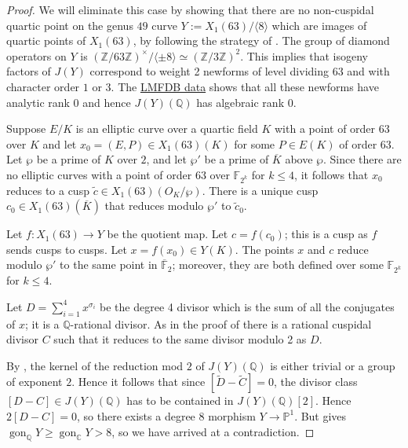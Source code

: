 \documentclass[11pt,reqno]{amsart}
\DeclareMathOperator{\gon}{gon}
\theoremstyle{definition}
\numberwithin{equation}{section}
\newcommand{\Q}{\mathbb{Q}}
\newcommand{\C}{\mathbb{C}}
\newcommand{\F}{\mathbb{F}}
\newcommand{\PP}{\mathbb{P}}
\def\torz#1{\mathbb Z /#1 \mathbb Z}
\newcommand{\diamondop}[1]{\langle #1 \rangle} %
\begin{document}
\begin{proof}
    We will eliminate this case by showing that there are no non-cuspidal quartic point on the genus $49$ curve $Y:=X_1(63)/\diamondop{8}$ which are images of quartic points of $X_1(63)$, by following the strategy of . The group of diamond operators on $Y$ is $(\torz{63})^\times/ \diamondop{\pm 8}\simeq (\torz{3})^2$. This implies that isogeny factors of $J(Y)$ correspond to weight 2 newforms of level dividing 63 and with character order $1$ or $3$. The \href{https://www.lmfdb.org/ModularForm/GL2/Q/holomorphic/?level_type=divides&level=63&weight=2&char_order=1%2C3&showcol=analytic_rank.char_order.prim&hidecol=analytic_conductor.field.cm.traces.qexp} {LMFDB data} shows that all these newforms have analytic rank 0 and hence $J(Y)(\Q)$ has algebraic rank $0$.

    
    
    

    Suppose $E/K$ is an elliptic curve over a quartic field $K$ with a point of order $63$ over $K$ and let $x_0=(E,P)\in X_1(63)(K)$ for some $P\in E(K)$ of order 63. Let $\wp$ be a prime of $K$ over $2$, and let $\wp'$ be a prime of $\overline K$ above $\wp$. Since there are no elliptic curves with a point of order $63$ over $\F_{2^k}$ for $k\leq 4$, it follows that $x_0$ reduces to a cusp $\widetilde c\in X_1(63)(O_K/\wp)$. There is a unique cusp $c_0\in X_1(63)(\overline K)$ that reduces modulo $\wp'$ to $\widetilde c_0$. %

  
    Let $f:X_1(63)\rightarrow Y$ be the quotient map. Let $c=f(c_0)$; this is a cusp as $f$ sends cusps to cusps. Let $x=f(x_0)\in Y(K)$. The points $x$ and $c$ reduce modulo $\wp'$ to the same point in $\overline{\F}_2$; moreover, they are both defined over some $\F_{2^k}$ for $k\leq 4$. %

    Let $D=\sum_{i=1}^4x^{\sigma_i}$ be the degree 4 divisor which is the sum of all the conjugates of $x$; it is a $\Q$-rational divisor. As in the proof of  there is a rational cuspidal divisor $C$ such that it reduces to the same divisor modulo 2 as $D.$ 

    By \cite[Prop 2.4]{Parent00}, the kernel of the reduction mod $2$ of $J(Y)(\Q)$ is either trivial or a group of exponent $2$. Hence it follows that since $[\widetilde D - \widetilde{C}]=0$, the divisor class $[D-C]\in J(Y)(\Q)$ has to be contained in $J(Y)(\Q)[2]$. Hence $2[D-C]=0$, so there exists a degree $8$ morphism $Y\rightarrow \PP^1$. But  gives $\gon_\Q Y \geq \gon_\C Y>8$, so we have arrived at a contradiction. 

\end{proof}
\end{document}
